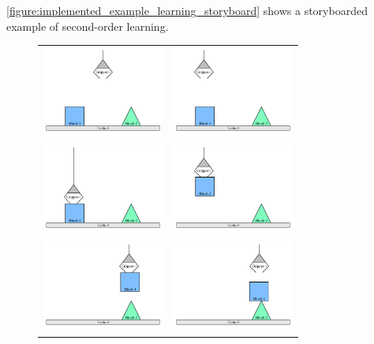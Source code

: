 {\mbox{\autoref{figure:implemented_example_learning_storyboard}}}
shows a storyboarded example of second-order learning.
\begin{figure}
\begin{center}
\begin{tabular}{cc}
\includegraphics[width=4cm]{gfx/blocks_world_example-1} & \includegraphics[width=4cm]{gfx/blocks_world_example-2} \\
\includegraphics[width=4cm]{gfx/blocks_world_example-3} & \includegraphics[width=4cm]{gfx/blocks_world_example-4} \\
\includegraphics[width=4cm]{gfx/blocks_world_example-5} & \includegraphics[width=4cm]{gfx/blocks_world_example-6} \\

\end{tabular}
\end{center}
\end{figure}
